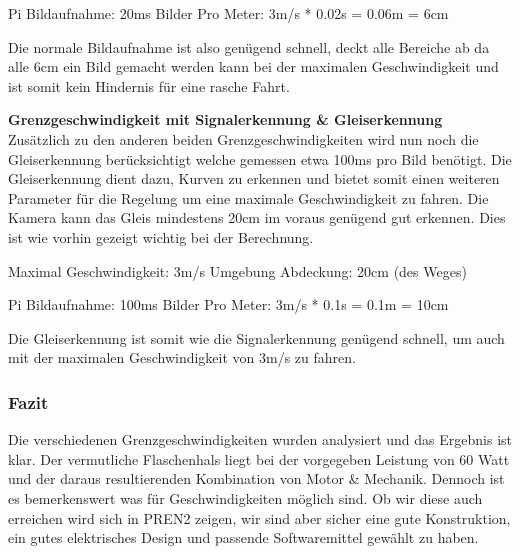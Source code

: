 \documentclass[../../main.tex]{subfiles}
\begin{document}
Pi Bildaufnahme: 20ms
Bilder Pro Meter: 3m/s * 0.02s = 0.06m = 6cm

Die normale Bildaufnahme ist also genügend schnell, deckt alle Bereiche ab da alle 6cm ein Bild gemacht werden kann bei
der maximalen Geschwindigkeit und ist somit kein Hindernis für eine rasche Fahrt.

\textbf{Grenzgeschwindigkeit mit Signalerkennung \& Gleiserkennung} \\
Zusätzlich zu den anderen beiden Grenzgeschwindigkeiten wird nun noch die Gleiserkennung berücksichtigt welche gemessen
etwa 100ms
pro Bild benötigt. Die Gleiserkennung dient dazu, Kurven zu erkennen und bietet somit einen weiteren Parameter für die
Regelung um eine maximale Geschwindigkeit zu fahren. Die Kamera kann das Gleis mindestens 20cm im voraus genügend gut
erkennen. Dies ist wie vorhin gezeigt wichtig bei der Berechnung.

Maximal Geschwindigkeit: 3m/s
Umgebung Abdeckung: 20cm (des Weges)

Pi Bildaufnahme: 100ms
Bilder Pro Meter: 3m/s * 0.1s = 0.1m = 10cm

Die Gleiserkennung ist somit wie die Signalerkennung genügend schnell, um auch mit der maximalen Geschwindigkeit von 3m/s
zu fahren.

\subsubsection{Fazit}
Die verschiedenen Grenzgeschwindigkeiten wurden analysiert und das Ergebnis ist klar. Der vermutliche Flaschenhals liegt
bei der vorgegeben Leistung von 60 Watt und der daraus resultierenden Kombination von Motor \& Mechanik. Dennoch ist es bemerkenswert
was für Geschwindigkeiten möglich sind. Ob wir diese auch erreichen wird sich in PREN2 zeigen, wir sind aber sicher eine
gute Konstruktion, ein gutes elektrisches Design und passende Softwaremittel gewählt zu haben.
\end{document}
